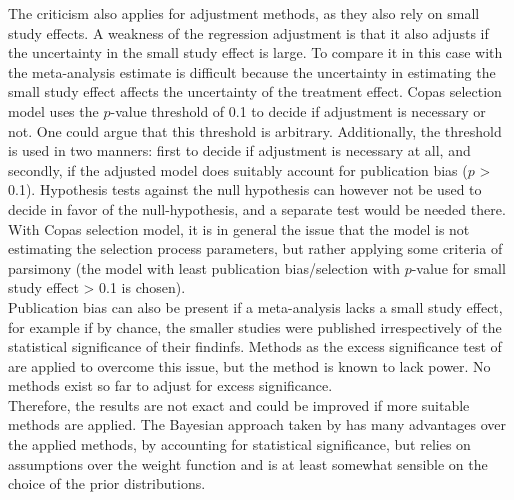 \documentclass[11pt,a4paper,twoside]{book}\usepackage[]{graphicx}\usepackage[]{color}
\begin{document}
The criticism also applies for adjustment methods, as they also rely on small study effects. A weakness of the regression adjustment is that it also adjusts if the uncertainty in the small study effect is large. To compare it in this case with the meta-analysis estimate is difficult because the uncertainty in estimating the small study effect affects the uncertainty of the treatment effect. Copas selection model uses the $p$-value threshold of 0.1 to decide if adjustment is necessary or not. One could argue that this threshold is arbitrary. Additionally, the threshold is used in two manners: first to decide if adjustment is necessary at all, and secondly, if the adjusted model does suitably account for publication bias ($p$ > 0.1). Hypothesis tests against the null hypothesis can however not be used to decide in favor of the null-hypothesis, and a separate test would be needed there. \\
With Copas selection model, it is in general the issue that the model is not estimating the selection process parameters, but rather applying some criteria of parsimony (the model with least publication bias/selection with $p$-value for small study effect > 0.1 is chosen). \\
Publication bias can also be present if a meta-analysis lacks a small study effect, for example if by chance, the smaller studies were published irrespectively of the statistical significance of their findinfs. Methods as the excess significance test of \citet{excess.significance} are applied to overcome this issue, but the method is known to lack power. No methods exist so far to adjust for excess significance.\\
Therefore, the results are not exact and could be improved if more suitable methods are applied. The Bayesian approach taken by \citet{kicinsky} has many advantages over the applied methods, \eg by accounting for statistical significance, but relies on assumptions over the weight function and is at least somewhat sensible on the choice of the prior distributions. \\
\end{document}
